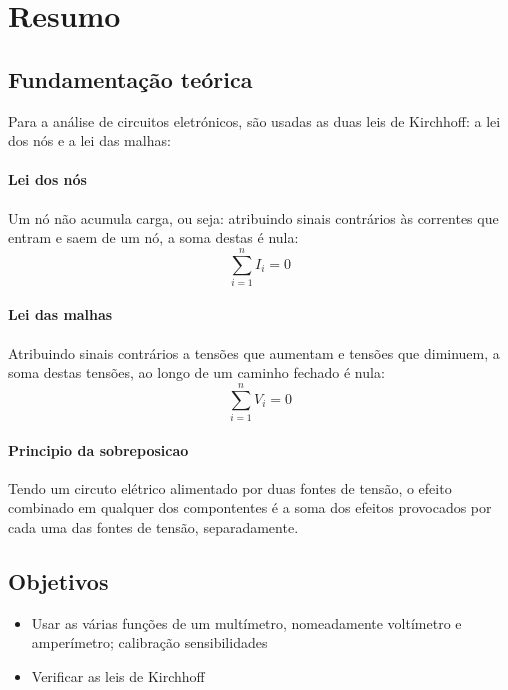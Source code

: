 \section{Resumo}


\subsection{Fundamentação teórica} \label{sec:fundam_teorica}
Para a análise de circuitos eletrónicos, são usadas as duas leis de Kirchhoff: a lei dos nós e a lei das malhas:

\paragraph{Lei dos nós}
Um nó não acumula carga, ou seja: atribuindo sinais contrários às correntes que entram e saem de um nó, a soma destas é nula:
\begin{equation*}
	\sum_{i=1}^{n} I_i = 0
\end{equation*}

\paragraph{Lei das malhas}
Atribuindo sinais contrários a tensões que aumentam e tensões que diminuem, a soma destas tensões, ao longo de um caminho fechado é nula:
\begin{equation*}
	\sum_{i=1}^{n} V_i = 0
\end{equation*}

\paragraph{Principio da sobreposicao}
Tendo um circuto elétrico alimentado por duas fontes de tensão, o efeito combinado em qualquer dos compontentes é a soma dos efeitos provocados por cada uma das fontes de tensão, separadamente.

\subsection{Objetivos}
\begin{itemize}
    \item Usar as várias funções de um multímetro, nomeadamente voltímetro e amperímetro; calibração sensibilidades
	 \item Verificar as leis de Kirchhoff
\end{itemize}

